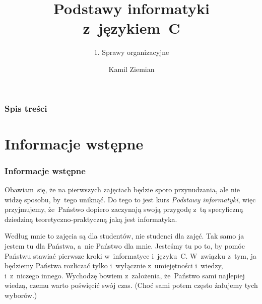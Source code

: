 \documentclass[10pt,t]{beamer}
\title{Podstawy informatyki z~językiem~C}
\subtitle{1. Sprawy organizacyjne}
\author{Kamil Ziemian \\
  \email}
\begin{document}





\RaggedRight





\maketitle





\begin{frame}
  \frametitle{Spis treści}


  \tableofcontents

\end{frame}





\section{Informacje wstępne}



\begin{frame}
  \frametitle{Informacje wstępne}


  Obawiam~się, że na pierwszych zajęciach będzie sporo przynudzania,
  ale nie widzę sposobu, by~tego uniknąć. Do tego to jest kurs
  \textit{Podstawy informatyki}, więc przyjmujemy, że~Państwo dopiero
  zaczynają swoją przygodę z~tą specyficzną dziedziną
  teoretyczno-praktyczną jaką jest informatyka.

  Według mnie to zajęcia są dla studentów, nie studenci dla zajęć. Tak samo
  ja jestem tu dla Państwa, a~nie Państwo dla mnie. Jesteśmy tu po to, by
  pomóc Państwu stawiać pierwsze kroki w~informatyce i~języku~C.
  W~związku z~tym, ja będziemy Państwa rozliczać tylko i~wyłącznie
  z~umiejętności i~wiedzy, i~z~niczego innego. Wychodzę bowiem z~założenia,
  że~Państwo sami najlepiej wiedzą, czemu warto poświęcić swój czas. (Choć
  sami potem często żałujemy tych wyborów.)

\end{frame}
\end{document}
